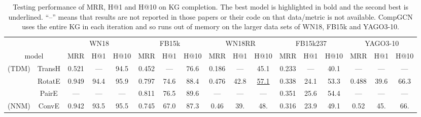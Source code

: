 \documentclass[10pt,journal,compsoc]{IEEEtran}
\begin{document}
\begin{table*}[ht]
	\caption{Testing performance of MRR, H@1 and H@10 on KG completion.
		The best model is highlighted in bold and the second best is underlined.
``--'' means that results are not reported in those papers or their code on that
		data/metric is not available.
		CompGCN  uses the entire KG in each iteration and  so runs out of memory  on the
		larger data sets of WN18, FB15k and YAGO3-10.}
	\label{tb:comparison}
	\centering
\setlength\tabcolsep{4pt}
	\vspace{-10px}
	\begin{tabular}{cc|ccc|ccc|ccc|ccc|ccc}
		\toprule
		& &                \multicolumn{3}{c|}{WN18}                &               \multicolumn{3}{c|}{FB15k}                &               \multicolumn{3}{c|}{WN18RR}               &              \multicolumn{3}{c|}{FB15k237}              &              \multicolumn{3}{c}{YAGO3-10}               \\ 
		\multicolumn{2}{c|}{model}                  &        MRR        &       H@1        &       H@10       &        MRR        &       H@1        &       H@10       &        MRR        &       H@1        &       H@10       &        MRR        &       H@1        &       H@10       &        MRR        &       H@1        &       H@10       \\ \midrule
		(TDM)  
		&    TransH     &       0.521       &       ---        &       94.5       &       0.452       &       ---        &       76.6       &       0.186       &       ---        &       45.1       &       0.233       &       ---        &       40.1       &        ---        &       ---        &       ---        \\
		&       RotatE       &       0.949       &       94.4       &       95.9       &       0.797       &       74.6       &       88.4       & {0.476} &       42.8       &  \underline{57.1}   &       0.338       &       24.1       &       53.3       &        0.488        &       39.6        &       66.3        \\ 
		&	PairE   &   --- & --- & --- &  0.811  &  76.5   &  89.6  &  --- &   --- &    ---  &  0.351  &   25.6  &   54.4   &   ---   &   ---   &    --- \\
		\midrule
		(NNM)  
		& ConvE   &       0.942       &       93.5       &      {95.5}      &       0.745       &       67.0       &       87.3       &       0.46        &       39.        &      {48.}       &      {0.316}      &       23.9       &       49.1       &       0.52        &       45.        &      {66.}       \\

\end{tabular}
\end{table*}
\end{document}
